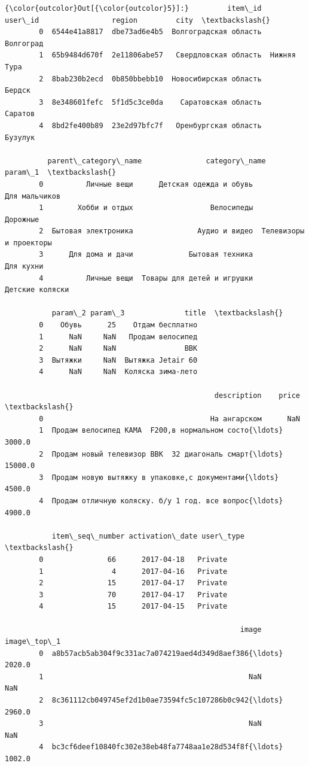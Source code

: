 \documentclass[11pt]{article}
\begin{document}
\begin{Verbatim}[commandchars=\\\{\}]
{\color{outcolor}Out[{\color{outcolor}5}]:}         item\_id       user\_id                 region         city  \textbackslash{}
        0  6544e41a8817  dbe73ad6e4b5  Волгоградская область    Волгоград   
        1  65b9484d670f  2e11806abe57   Свердловская область  Нижняя Тура   
        2  8bab230b2ecd  0b850bbebb10  Новосибирская область       Бердск   
        3  8e348601fefc  5f1d5c3ce0da    Саратовская область      Саратов   
        4  8bd2fe400b89  23e2d97bfc7f   Оренбургская область      Бузулук   
        
          parent\_category\_name               category\_name                 param\_1  \textbackslash{}
        0          Личные вещи      Детская одежда и обувь           Для мальчиков   
        1        Хобби и отдых                  Велосипеды                Дорожные   
        2  Бытовая электроника               Аудио и видео  Телевизоры и проекторы   
        3      Для дома и дачи             Бытовая техника               Для кухни   
        4          Личные вещи  Товары для детей и игрушки         Детские коляски   
        
           param\_2 param\_3              title  \textbackslash{}
        0    Обувь      25    Отдам бесплатно   
        1      NaN     NaN   Продам велосипед   
        2      NaN     NaN                BBK   
        3  Вытяжки     NaN  Вытяжка Jetair 60   
        4      NaN     NaN  Коляска зима-лето   
        
                                                 description    price  \textbackslash{}
        0                                       На ангарском      NaN   
        1  Продам велосипед KAMA  F200,в нормальном состо{\ldots}   3000.0   
        2  Продам новый телевизор BBK  32 диагональ смарт{\ldots}  15000.0   
        3  Продам новую вытяжку в упаковке,с документами{\ldots}   4500.0   
        4  Продам отличную коляску. б/у 1 год. все вопрос{\ldots}   4900.0   
        
           item\_seq\_number activation\_date user\_type  \textbackslash{}
        0               66      2017-04-18   Private   
        1                4      2017-04-16   Private   
        2               15      2017-04-17   Private   
        3               70      2017-04-17   Private   
        4               15      2017-04-15   Private   
        
                                                       image  image\_top\_1  
        0  a8b57acb5ab304f9c331ac7a074219aed4d349d8aef386{\ldots}       2020.0  
        1                                                NaN          NaN  
        2  8c361112cb049745ef2d1b0ae73594fc5c107286b0c942{\ldots}       2960.0  
        3                                                NaN          NaN  
        4  bc3cf6deef10840fc302e38eb48fa7748aa1e28d534f8f{\ldots}       1002.0  
\end{Verbatim}
            
\end{document}
